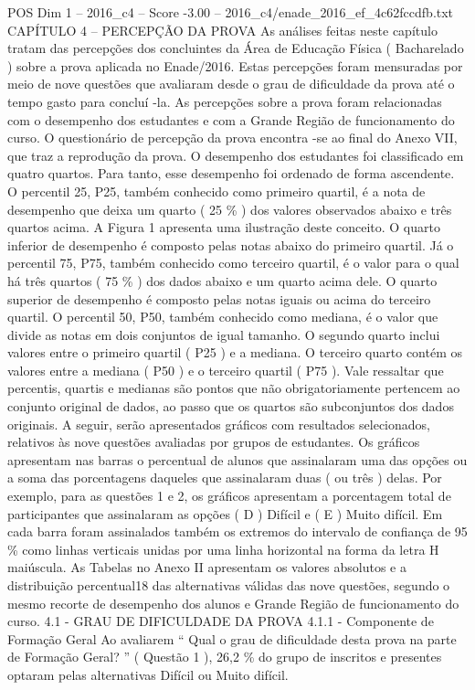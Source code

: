\begin{textsample}{POS Dim 1 – 2016\_c4 – Score -3.00 – 2016\_c4/enade\_2016\_ef\_4c62fccdfb.txt}  \label{ex:f1_pos_286}
CAPÍTULO 4 – PERCEPÇÃO DA PROVA As análises feitas neste capítulo tratam das percepções dos concluintes da Área de Educação Física ( Bacharelado ) sobre a prova aplicada no Enade/2016.
Estas percepções foram mensuradas por meio de nove questões que avaliaram desde o grau de dificuldade da prova até o tempo gasto para concluí -la.
As percepções sobre a prova foram relacionadas com o desempenho dos estudantes e com a Grande Região de funcionamento do curso.
O questionário de percepção da prova encontra -se ao final do Anexo VII, que traz a reprodução da prova.
O desempenho dos estudantes foi classificado em quatro quartos.
Para tanto, esse desempenho foi ordenado de forma ascendente.
O percentil 25, P25, também conhecido como primeiro quartil, é a nota de desempenho que deixa um quarto ( 25 \% ) dos valores observados abaixo e três quartos acima.
A Figura 1 apresenta uma ilustração deste conceito.
O quarto inferior de desempenho é composto pelas notas abaixo do primeiro quartil.
Já o percentil 75, P75, também conhecido como terceiro quartil, é o valor para o qual há três quartos ( 75 \% ) dos dados abaixo e um quarto acima dele.
O quarto superior de desempenho é composto pelas notas iguais ou acima do terceiro quartil.
O percentil 50, P50, também conhecido como mediana, é o valor que divide as notas em dois conjuntos de igual tamanho.
O segundo quarto inclui valores entre o primeiro quartil ( P25 ) e a mediana.
O terceiro quarto contém os valores entre a mediana ( P50 ) e o terceiro quartil ( P75 ).
Vale ressaltar que percentis, quartis e medianas são pontos que não obrigatoriamente pertencem ao conjunto original de dados, ao passo que os quartos são subconjuntos dos dados originais.
A seguir, serão apresentados gráficos com resultados selecionados, relativos às nove questões avaliadas por grupos de estudantes.
Os gráficos apresentam nas barras o percentual de alunos que assinalaram uma das opções ou a soma das porcentagens daqueles que assinalaram duas ( ou três ) delas.
Por exemplo, para as questões 1 e 2, os gráficos apresentam a porcentagem total de participantes que assinalaram as opções ( D ) Difícil e ( E ) Muito difícil.
Em cada barra foram assinalados também os extremos do intervalo de confiança de 95 \% como linhas verticais unidas por uma linha horizontal na forma da letra H maiúscula.
As Tabelas no Anexo II apresentam os valores absolutos e a distribuição percentual18 das alternativas válidas das nove questões, segundo o mesmo recorte de desempenho dos alunos e Grande Região de funcionamento do curso. 4.1 - GRAU DE DIFICULDADE DA PROVA 4.1.1 - Componente de Formação Geral Ao avaliarem “ Qual o grau de dificuldade desta prova na parte de Formação Geral? ” ( Questão 1 ), 26,2 \% do grupo de inscritos e presentes optaram pelas alternativas Difícil ou Muito difícil.

\end{textsample}
